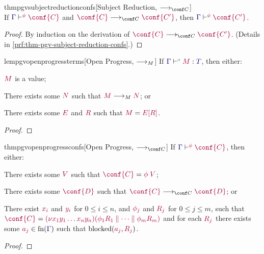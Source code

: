 \documentclass[main.tex]{subfiles}
\begin{document}
\begin{restatabletheorem}{thmpgvsubjectreductionconfs}[Subject Reduction, $\cred$]
  \label{thm:pgv-subject-reduction-confs}
  \hfill\\%
  If $\cseq[\phi]{\ty{\Gamma}}{\conf{C}}$ and $\tm{\conf{C}}\cred\tm{\conf{C'}}$,
  then $\cseq[\phi]{\ty{\Gamma}}{\conf{C'}}$.
\end{restatabletheorem}
\begin{proof}
  By induction on the derivation of $\tm{\conf{C}}\cred\tm{\conf{C'}}$.
  (Details in \cref{prf:thm-pgv-subject-reduction-confs}.)
\end{proof}

\begin{restatablelemma}{lempgvopenprogressterms}[Open Progress, $\longrightarrow_{M}$]
  \label{lem:pgv-open-progress-terms}
  If $\tseq[\cs{o}]{\ty{\Gamma}}{M}{T}$, then either:
  \begin{description}[labelwidth=8ex]
  \item[Done]
    $\tm{M}$ is a value;
  \item[Step]
    There exists some $\tm{N}$ such that $\tm{M}\tred\tm{N}$; or
  \item[Blocked]
    There exists some $\tm{E}$ and $\tm{R}$ such that $\tm{M}=\tm{\plug{E}{R}}$.
  \end{description}
\end{restatablelemma}
\begin{proof}
  \admit
\end{proof}

\begin{restatabletheorem}{thmpgvopenprogressconfs}[Open Progress, $\cred$]
  \label{thm:pgv-open-progress-confs}
  If $\cseq[\phi]{\ty{\Gamma}}{\conf{C}}$, then either:
  \begin{description}[labelwidth=8ex]
  \item[Done]
    There exists some $\tm{V}$ such that $\tm{\conf{C}}=\tm{\phi\;V}$;
  \item[Step]
    There exists some $\tm{\conf{D}}$ such that $\tm{\conf{C}} \cred \tm{\conf{D}}$; or
  \item[Blocked]
    There exist $\tm{x_i}$ and $\tm{y_i}$ for $0\leq{i}\leq{n}$, and $\tm{\phi_j}$ and $\tm{R_j}$ for $0\leq{j}\leq{m}$, such that $\tm{\conf{C}}=\tm{\res{x_1y_1\dots x_ny_n}{}{(\phi_1R_1 \parallel\dots\parallel \phi_mR_m)}}$ and for each $\tm{R_j}$ there exists some $\tm{a_j}\in\fn(\ty{\Gamma})$ such that $\blocked(\tm{a_j},\tm{R_j})$.
  \end{description}
\end{restatabletheorem}
\begin{proof}
  \admit
\end{proof}
\end{document}
